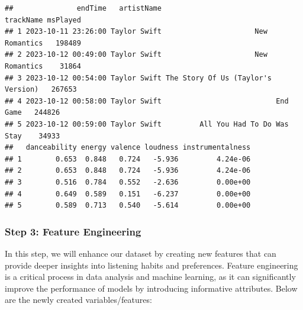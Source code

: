 \documentclass[
]{article}
\begin{document}
\begin{verbatim}
##               endTime   artistName                          trackName msPlayed
## 1 2023-10-11 23:26:00 Taylor Swift                      New Romantics   198489
## 2 2023-10-12 00:49:00 Taylor Swift                      New Romantics    31864
## 3 2023-10-12 00:54:00 Taylor Swift The Story Of Us (Taylor's Version)   267653
## 4 2023-10-12 00:58:00 Taylor Swift                           End Game   244826
## 5 2023-10-12 00:59:00 Taylor Swift         All You Had To Do Was Stay    34933
##   danceability energy valence loudness instrumentalness
## 1        0.653  0.848   0.724   -5.936         4.24e-06
## 2        0.653  0.848   0.724   -5.936         4.24e-06
## 3        0.516  0.784   0.552   -2.636         0.00e+00
## 4        0.649  0.589   0.151   -6.237         0.00e+00
## 5        0.589  0.713   0.540   -5.614         0.00e+00
\end{verbatim}

\subsubsection{Step 3: Feature
Engineering}\label{step-3-feature-engineering}

In this step, we will enhance our dataset by creating new features that
can provide deeper insights into listening habits and preferences.
Feature engineering is a critical process in data analysis and machine
learning, as it can significantly improve the performance of models by
introducing informative attributes. Below are the newly created
variables/features:
\end{document}
